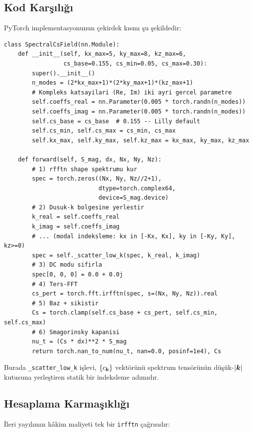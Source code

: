 \subsection{Kod Karşılığı}

PyTorch implementasyonunun çekirdek kısmı şu şekildedir:

\begin{lstlisting}[caption={SpectralCsField cekirdek forward (innate.py:4474+).}]
class SpectralCsField(nn.Module):
    def __init__(self, kx_max=5, ky_max=8, kz_max=6,
                 cs_base=0.155, cs_min=0.05, cs_max=0.30):
        super().__init__()
        n_modes = (2*kx_max+1)*(2*ky_max+1)*(kz_max+1)
        # Kompleks katsayilari (Re, Im) iki ayri gercel parametre
        self.coeffs_real = nn.Parameter(0.005 * torch.randn(n_modes))
        self.coeffs_imag = nn.Parameter(0.005 * torch.randn(n_modes))
        self.cs_base = cs_base  # 0.155 -- Lilly default
        self.cs_min, self.cs_max = cs_min, cs_max
        self.kx_max, self.ky_max, self.kz_max = kx_max, ky_max, kz_max

    def forward(self, S_mag, dx, Nx, Ny, Nz):
        # 1) rfftn shape spektrumu kur
        spec = torch.zeros((Nx, Ny, Nz//2+1),
                           dtype=torch.complex64,
                           device=S_mag.device)
        # 2) Dusuk-k bolgesine yerlestir
        k_real = self.coeffs_real
        k_imag = self.coeffs_imag
        # ... (modal indeksleme: kx in [-Kx, Kx], ky in [-Ky, Ky], kz>=0)
        spec = self._scatter_low_k(spec, k_real, k_imag)
        # 3) DC modu sifirla
        spec[0, 0, 0] = 0.0 + 0.0j
        # 4) Ters-FFT
        cs_pert = torch.fft.irfftn(spec, s=(Nx, Ny, Nz)).real
        # 5) Baz + sikistir
        Cs = torch.clamp(self.cs_base + cs_pert, self.cs_min, self.cs_max)
        # 6) Smagorinsky kapanisi
        nu_t = (Cs * dx)**2 * S_mag
        return torch.nan_to_num(nu_t, nan=0.0, posinf=1e4), Cs
\end{lstlisting}

Burada \texttt{\_scatter\_low\_k} işlevi, $\{c_{\bm{k}}\}$ vektörünü
spektrum tensörünün düşük-$|\bm{k}|$ kutusuna yerleştiren statik bir
indeksleme adımıdır.

\subsection{Hesaplama Karmaşıklığı}

İleri yayılımın hâkim maliyeti tek bir \texttt{irfftn} çağrısıdır:

